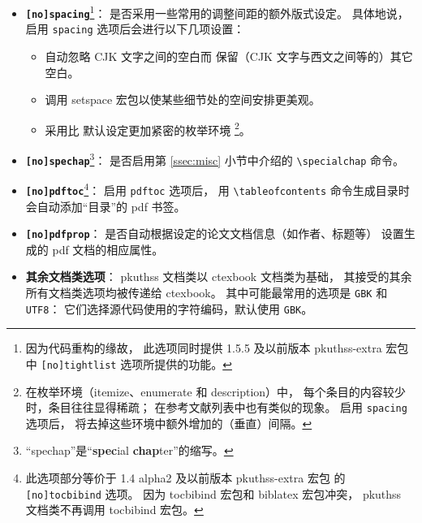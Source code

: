 \begin{itemize}
	\item \textbf{\texttt{[no]spacing}}\footnote{%
			因为代码重构的缘故，
			此选项同时提供 1.5.5 及以前版本 pkuthss-extra 宏包
			中 \texttt{[no]tightlist} 选项所提供的功能。%
		}：
		是否采用一些常用的调整间距的额外版式设定。
		具体地说，启用 \verb|spacing| 选项后会进行以下几项设置：
	\begin{itemize}
		\item 自动忽略 CJK 文字之间的空白而
			保留（CJK 文字与西文之间等的）其它空白。
		\item 调用 setspace 宏包以使某些细节处的空间安排更美观。
		\item 采用比  默认设定更加紧密的枚举环境%
			\footnote{%
				在枚举环境（itemize、enumerate 和 description）中，
				每个条目的内容较少时，条目往往显得稀疏；
				在参考文献列表中也有类似的现象。
				启用 \texttt{spacing} 选项后，
				将去掉这些环境中额外增加的（垂直）间隔。%
			}。
	\end{itemize}

	\item \textbf{\texttt{[no]spechap}}\footnote{%
			“spechap”是“\textbf{spec}ial \textbf{chap}ter”的缩写。%
		}：
		是否启用第 \ref{ssec:misc} 小节中介绍的 \verb|\specialchap| 命令。

	\item \textbf{\texttt{[no]pdftoc}}\footnote{%
			此选项部分等价于 1.4 alpha2 及以前版本 pkuthss-extra 宏包
			的 \texttt{[no]tocbibind} 选项。
			因为 tocbibind 宏包和 biblatex 宏包冲突，%
			pkuthss 文档类不再调用 tocbibind 宏包。%
		}：
		启用 \verb|pdftoc| 选项后，
		用 \verb|\tableofcontents| 命令生成目录时会自动添加“目录”的 pdf 书签。

	\item \textbf{\texttt{[no]pdfprop}}：
		是否自动根据设定的论文文档信息（如作者、标题等）
		设置生成的 pdf 文档的相应属性。

	\item \textbf{其余文档类选项}：%
		pkuthss 文档类以 ctexbook 文档类为基础，
		其接受的其余所有文档类选项均被传递给 ctexbook。
		其中可能最常用的选项是 \verb|GBK| 和 \verb|UTF8|：
		它们选择源代码使用的字符编码，默认使用 \verb|GBK|。
\end{itemize}

